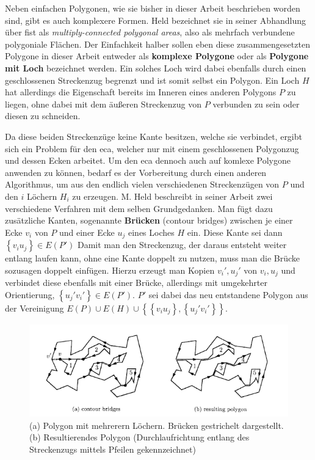 Neben einfachen Polygonen, wie sie bisher in dieser Arbeit beschrieben worden sind, gibt es auch komplexere Formen. Held bezeichnet sie in seiner Abhandlung über \ac{fist} als \emph{multiply-connected polygonal areas}, 
also als mehrfach verbundene polygoniale Flächen.\cite{fist} Der Einfachkeit halber sollen eben diese zusammengesetzten Polygone in dieser Arbeit entweder als \textbf{komplexe Polygone} oder als \textbf{Polygone mit Loch} bezeichnet werden.
Ein solches Loch wird dabei ebenfalls durch einen geschlossenen Streckenzug begrenzt und ist somit selbst ein Polygon. Ein Loch $H$ hat allerdings die Eigenschaft bereits im Inneren eines anderen Polygons $P$ zu liegen, ohne dabei mit dem äußeren 
Streckenzug von $P$ verbunden zu sein oder diesen zu schneiden. 

Da diese beiden Streckenzüge keine Kante besitzen, welche sie verbindet, ergibt sich ein Problem für den \ac{eca}, welcher nur mit einem geschlossenen Polygonzug und dessen Ecken arbeitet. Um den \ac{eca} dennoch auch auf komlexe Polygone anwenden zu können,
bedarf es der Vorbereitung durch einen anderen Algorithmus, um aus den endlich vielen verschiedenen Streckenzügen von $P$ und den $i$ Löchern $H_i$ zu erzeugen.
M. Held beschreibt in seiner Arbeit zwei verschiedene Verfahren mit dem selben Grundgedanken. Man fügt dazu zusätzliche Kanten, sogenannte \textbf{Brücken} (contour bridges) zwischen je einer Ecke $v_i$ von $P$ und einer Ecke $u_j$ eines Loches $H$ ein. Diese Kante sei dann $\left\{v_iu_j\right\} \in E(P')$
Damit man den Streckenzug, der daraus entsteht weiter entlang laufen kann, ohne eine Kante doppelt zu nutzen, muss man die Brücke sozusagen doppelt einfügen. Hierzu erzeugt man Kopien $v_i', u_j'$ von $v_i, u_j$ und verbindet diese ebenfalls mit einer Brücke, 
allerdings mit umgekehrter Orientierung, $\left\{u_j'v_i'\right\} \in E(P')$. $P'$ sei dabei das neu entstandene Polygon aus der Vereinigung $E(P)\cup E(H) \cup \left\{ \left\{v_iu_j\right\},\left\{u_j'v_i'\right\} \right\} $.

\begin{figure}
  \centering
  \includegraphics[width=1\textwidth]{bilder/bridges.png}
  \caption[Vereinfachung eines Polygons mit mehreren Löchern zu einem einfachen Polygon]{\centering (a) Polygon mit mehrerern Löchern. Brücken gestrichelt dargestellt. (b) Resultierendes Polygon (Durchlaufrichtung entlang des Streckenzugs mittels Pfeilen gekennzeichnet)\cite{fist}}
  \label{fig:bridges}
\end{figure}

